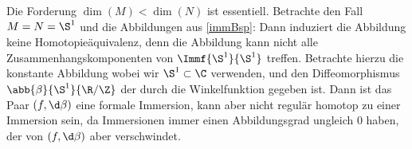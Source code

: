 \begin{Bsp}
	Die Forderung $ \dim(M)<\dim(N) $ ist essentiell. Betrachte 
	den Fall $ M=N=\S^1 $ und die Abbildungen aus \cref{immBsp}:
	Dann induziert die Abbildung 
	keine Homotopieäquivalenz, denn die Abbildung kann
	nicht alle Zusammenhangskomponenten von $ \Immf{\S^1}{\S^1} $
	treffen. Betrachte hierzu die konstante Abbildung
	 wobei wir $ \S^1\subset\C $ 
	verwenden, und den Diffeomorphismus $ \abb{\beta}{\S^1}{\R / \Z} $
	der durch die Winkelfunktion gegeben ist. Dann ist das Paar $ (f,\d \beta) $ eine formale Immersion, kann aber nicht regulär
	homotop zu einer Immersion sein, da Immersionen immer einen 
	Abbildungsgrad ungleich $ 0 $ haben, der von $ (f,\d \beta) $ aber
	verschwindet.
\end{Bsp}


